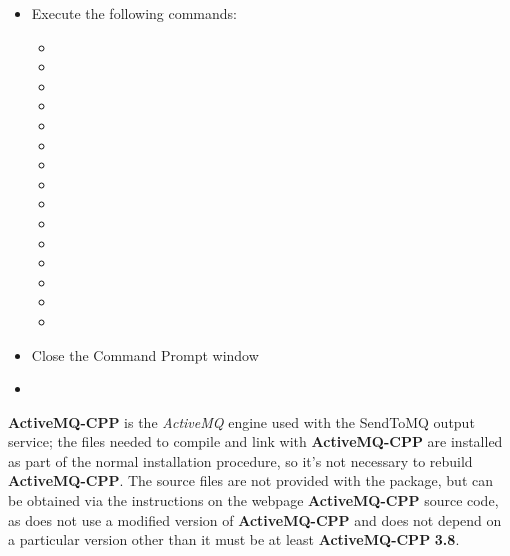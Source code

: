 \begin{itemize}
{{-}{-}host=x86\fUS{}64-pc-mingw32}'; note that the build environment has problems with the
standard Windows paths for program files, so the target directory is not the final one
\item\exSp{}Execute the following commands:
\begin{itemize}
\item {}
\item\exSp{}
\item\exSp{}
\item\exSp{}
\item\exSp{}
\item\exSp{}
\item\exSp{}
\item\exSp{}
\item\exSp{}
\item\exSp{}
\item\exSp{}
\item\exSp{}
\item\exSp{}
\item\exSp{}
\item\exSp{}
\end{itemize}
\item\exSp{}Close the Command Prompt window
\end{itemize}
\tertiaryEnd
{}
\begin{itemize}
\item\TBD
\end{itemize}
\tertiaryEnd
\secondaryEnd
{}
\textbf{ActiveMQ-CPP} is the \emph{ActiveMQ} engine used with the SendToMQ output service;
the files needed to compile and link with \textbf{ActiveMQ-CPP} are installed as part of
the normal \mplusm{} installation procedure, so it's not necessary to rebuild
\textbf{ActiveMQ-CPP}.
The source files are not provided with the  package, but can be obtained
via the instructions on the web\longDash{}page
%
{\textbf{ActiveMQ-CPP} source code}, as \mplusm{} does not use a modified version of
\textbf{ActiveMQ-CPP} and does not depend on a particular version \longDash{} other than
it must be at least \textbf{ActiveMQ-CPP} \textbf{3.8}.\\


